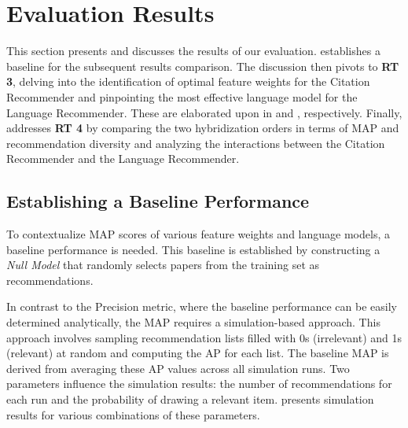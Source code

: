 \section{Evaluation Results} \label{sec:evaluation-results}

This section presents and discusses the results of our evaluation.
 establishes a baseline for the subsequent results comparison.
The discussion then pivots to \textbf{\ac{RT} 3}, delving into the identification of optimal feature weights for the Citation Recommender and pinpointing the most effective language model for the Language Recommender. These are elaborated upon in  and , respectively.
Finally,  addresses \textbf{\ac{RT} 4} by comparing the two hybridization orders in terms of \ac{MAP} and recommendation diversity and analyzing the interactions between the Citation Recommender and the Language Recommender.


\subsection{Establishing a Baseline Performance} \label{sec:establishing-baseline-performance}

To contextualize \ac{MAP} scores of various feature weights and language models, a baseline performance is needed.
This baseline is established by constructing a \emph{Null Model} that randomly selects papers from the training set as recommendations.

In contrast to the Precision metric, where the baseline performance can be easily determined analytically, the \ac{MAP} requires a simulation-based approach.
This approach involves sampling recommendation lists filled with 0s (irrelevant) and 1s (relevant) at random and computing the \ac{AP} for each list.
The baseline \ac{MAP} is derived from averaging these \ac{AP} values across all simulation runs.
Two parameters influence the simulation results: the number of recommendations for each run and the probability of drawing a relevant item.
 presents simulation results for various combinations of these parameters.

